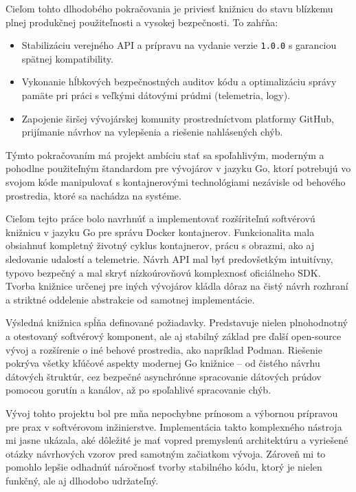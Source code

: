 \documentclass[
 program=infpvs,
  language=slovak,
  figures=false,
  tables=false,
  sourcecodes,
  glossaries,
  index
]{kidiplom}
\begin{document}
{Cieľom tohto dlhodobého pokračovania je priviesť knižnicu do stavu blízkemu plnej produkčnej použiteľnosti a vysokej bezpečnosti. To zahŕňa:
\begin{itemize}
    \item Stabilizáciu verejného API a prípravu na vydanie verzie \texttt{1.0.0} s garanciou spätnej kompatibility.
    \item Vykonanie hĺbkových bezpečnostných auditov kódu a optimalizáciu správy pamäte pri práci s veľkými dátovými prúdmi (telemetria, logy).
    \item Zapojenie širšej vývojárskej komunity prostredníctvom platformy GitHub, prijímanie návrhov na vylepšenia a riešenie nahlásených chýb.
\end{itemize}

Týmto pokračovaním má projekt ambíciu stať sa spoľahlivým, moderným a pohodlne použiteľným štandardom pre vývojárov v jazyku Go, ktorí potrebujú vo svojom kóde manipulovať s kontajnerovými technológiami nezávisle od behového prostredia, ktoré sa nachádza na systéme.

\begin{kiconclusions}
Cieľom tejto práce bolo navrhnúť a implementovať rozšíriteľnú softvérovú knižnicu v jazyku Go pre správu Docker kontajnerov. Funkcionalita mala obsiahnuť kompletný životný cyklus kontajnerov, prácu s obrazmi, ako aj sledovanie udalostí a telemetrie. Návrh API mal byť predovšetkým intuitívny, typovo bezpečný a mal skryť nízkoúrovňovú komplexnosť oficiálneho SDK. Tvorba knižnice určenej pre iných vývojárov kládla dôraz na čistý návrh rozhraní a striktné oddelenie abstrakcie od samotnej implementácie.

Výsledná knižnica spĺňa definované požiadavky. Predstavuje nielen plnohodnotný a otestovaný softvérový komponent, ale aj stabilný základ pre ďalší open-source vývoj a rozšírenie o iné behové prostredia, ako napríklad Podman. Riešenie pokrýva všetky kľúčové aspekty modernej Go knižnice – od čistého návrhu dátových štruktúr, cez bezpečné asynchrónne spracovanie dátových prúdov pomocou gorutín a kanálov, až po spoľahlivé spracovanie chýb.

Vývoj tohto projektu bol pre mňa nepochybne prínosom a výbornou prípravou pre prax v softvérovom inžinierstve. Implementácia takto komplexného nástroja mi jasne ukázala, aké dôležité je mať vopred premyslenú architektúru a vyriešené otázky návrhových vzorov pred samotným začiatkom vývoja. Zároveň mi to pomohlo lepšie odhadnúť náročnosť tvorby stabilného kódu, ktorý je nielen funkčný, ale aj dlhodobo udržateľný.
\end{kiconclusions}

}
\end{document}
